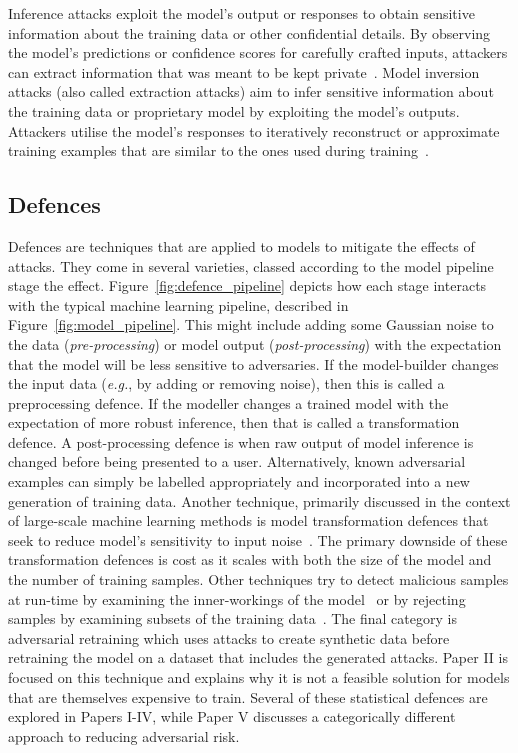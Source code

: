 Inference attacks exploit the model's output or responses to obtain sensitive information about the training data or other confidential details. By observing the model's predictions or confidence scores for carefully crafted inputs, attackers can extract information that was meant to be kept private~\cite{chakraborty_adversarial_2018,orekondy2019knockoff}.
Model inversion attacks (also called extraction attacks) aim to infer sensitive information about the training data or proprietary model by exploiting the model's outputs. Attackers utilise the model's responses to iteratively reconstruct or approximate training examples that are similar to the ones used during training~\cite{chakraborty_adversarial_2018,choquette2021label,li2021membership}.

\subsection{Defences}
Defences are techniques that are applied to models to mitigate the effects of attacks. 
They come in several varieties, classed according to the model pipeline stage the effect. 
Figure~\ref{fig:defence_pipeline} depicts how each stage interacts with the typical machine learning pipeline, described in Figure~\ref{fig:model_pipeline}.
This might include adding some Gaussian noise to the data (\textit{pre-processing}) or model output (\textit{post-processing}) with the expectation that the model will be less sensitive to adversaries. 
If the model-builder changes the input data (\textit{e.g.}, by adding or removing noise), then this is called a preprocessing defence. 
If the modeller changes a trained model with the expectation of more robust inference, then that is called a transformation defence. 
A post-processing defence is when raw output of model inference is changed before being presented to a user. 
Alternatively, known adversarial examples can simply be labelled appropriately and incorporated into a new generation of training data.
Another technique, primarily discussed in the context of large-scale machine learning methods is model transformation defences that seek to reduce model's sensitivity to input noise~\cite{papernot_distillation_2016,gao2017deepcloak,wang2018defensive}. 
The primary downside of these transformation defences is cost as it scales with both the size of the model and the number of training samples. 
Other techniques try to detect malicious samples at run-time by examining the inner-workings of the model~\cite{chen2018detecting} or by rejecting samples by examining subsets of the training data~\cite{mcfowland2013fast,nelson2009misleading}. 
The final category is adversarial retraining which uses attacks to create synthetic data before retraining the model on a dataset that includes the generated attacks.
Paper II is focused on this technique and explains why it is not a feasible solution for models that are themselves expensive to train. 
Several of these statistical defences are explored in Papers I-IV, while Paper V discusses a categorically different approach to reducing adversarial risk.



